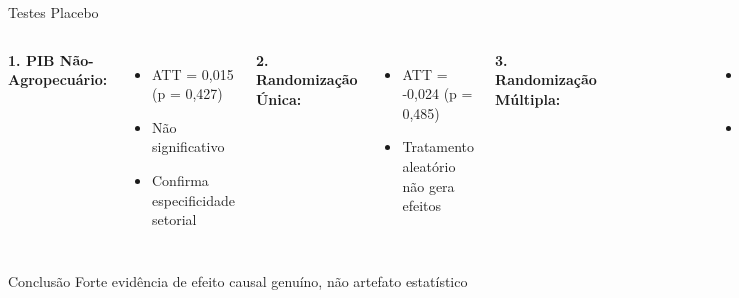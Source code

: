 \documentclass[10pt,aspectratio=169]{beamer}
\begin{document}
\begin{frame}{Testes Placebo}
\begin{columns}
\textbf{1. PIB Não-Agropecuário:}
\begin{itemize}
    \item ATT = 0,015 (p = 0,427)
    \item Não significativo
    \item Confirma especificidade setorial
\end{itemize}

\textbf{2. Randomização Única:}
\begin{itemize}
    \item ATT = -0,024 (p = 0,485)
    \item Tratamento aleatório não gera efeitos
\end{itemize}

\textbf{3. Randomização Múltipla:}
\begin{figure}
\centering
\includegraphics[width=\textwidth]{../../../data/outputs/placebo_distribution.png}
\end{figure}
\begin{itemize}
    \item 50 simulações
    \item P-valor empírico < 0,01
\end{itemize}
\end{columns}

\begin{block}{Conclusão}
Forte evidência de efeito causal genuíno, não artefato estatístico
\end{block}
\end{frame}
\end{document}
